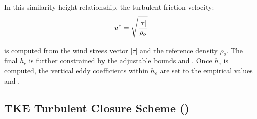 \documentclass[NEMO_book]{subfiles}
\begin{document}
In this similarity height relationship, the turbulent friction velocity:
\begin{equation}
         u^{*} = \sqrt \frac {|\tau|} {\rho_o}  	\\
\end{equation}

is computed from the wind stress vector $|\tau|$ and the reference density $ \rho_o$.
The final $h_{e}$ is further constrained by the adjustable bounds  and .
Once $h_{e}$ is computed, the vertical eddy coefficients within $h_{e}$ are set to 
the empirical values  and  \citep{Lermusiaux2001}.

\subsection{TKE Turbulent Closure Scheme ()}
\label{ZDF_tke}

\end{document}
